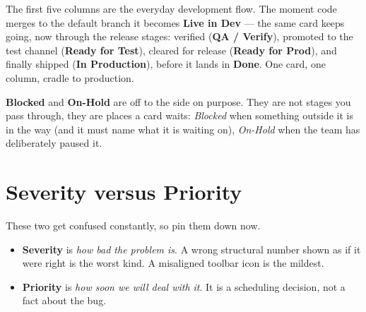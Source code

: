 \documentclass[11pt,a4paper]{report}
\begin{document}
\begin{center}
\end{center}

The first five columns are the everyday development flow. The moment code merges to
the default branch it becomes \textbf{Live in Dev} --- the same card keeps going,
now through the release stages: verified (\textbf{QA / Verify}), promoted to the
test channel (\textbf{Ready for Test}), cleared for release (\textbf{Ready for
Prod}), and finally shipped (\textbf{In Production}), before it lands in
\textbf{Done}. One card, one column, cradle to production.

\textbf{Blocked} and \textbf{On-Hold} are off to the side on purpose. They are not
stages you pass through, they are places a card waits: \emph{Blocked} when something
outside it is in the way (and it must name what it is waiting on), \emph{On-Hold}
when the team has deliberately paused it.

\section{Severity versus Priority}
These two get confused constantly, so pin them down now.

\begin{itemize}[leftmargin=1.4em,itemsep=2pt]
  \item \textbf{Severity} is \emph{how bad the problem is}. A wrong structural
        number shown as if it were right is the worst kind. A misaligned toolbar
        icon is the mildest.
  \item \textbf{Priority} is \emph{how soon we will deal with it}. It is a
        scheduling decision, not a fact about the bug.
\end{itemize}
\end{document}
